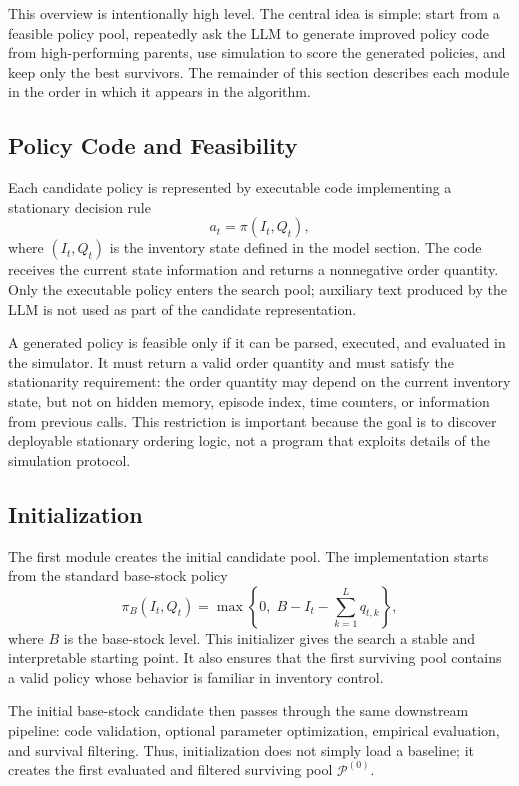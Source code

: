 \documentclass[11pt]{article}
\begin{document}
This overview is intentionally high level. The central idea is simple: start from a feasible policy pool, repeatedly ask the LLM to generate improved policy code from high-performing parents, use simulation to score the generated policies, and keep only the best survivors. The remainder of this section describes each module in the order in which it appears in the algorithm.

\subsection{Policy Code and Feasibility}
\label{sec:policy_code}

Each candidate policy is represented by executable code implementing a stationary decision rule
\[
a_t=\pi(I_t,Q_t),
\]
where $(I_t,Q_t)$ is the inventory state defined in the model section. The code receives the current state information and returns a nonnegative order quantity. Only the executable policy enters the search pool; auxiliary text produced by the LLM is not used as part of the candidate representation.

A generated policy is feasible only if it can be parsed, executed, and evaluated in the simulator. It must return a valid order quantity and must satisfy the stationarity requirement: the order quantity may depend on the current inventory state, but not on hidden memory, episode index, time counters, or information from previous calls. This restriction is important because the goal is to discover deployable stationary ordering logic, not a program that exploits details of the simulation protocol.

\subsection{Initialization}
\label{sec:initialization}

The first module creates the initial candidate pool. The implementation starts from the standard base-stock policy
\[
\pi_B(I_t,Q_t)=\max\left\{0,\;B-I_t-\sum_{k=1}^{L}q_{t,k}\right\},
\]
where $B$ is the base-stock level. This initializer gives the search a stable and interpretable starting point. It also ensures that the first surviving pool contains a valid policy whose behavior is familiar in inventory control.

The initial base-stock candidate then passes through the same downstream pipeline: code validation, optional parameter optimization, empirical evaluation, and survival filtering. Thus, initialization does not simply load a baseline; it creates the first evaluated and filtered surviving pool $\mathcal P^{(0)}$.
\end{document}
